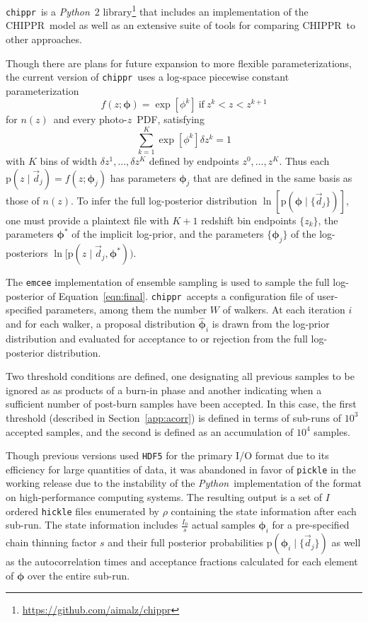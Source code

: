\documentclass[iop]{emulateapj}
\newcommand{\todo}[3]{{\color{#2}\emph{#1}: #3}}
\newcommand{\aim}[1]{\todo{AIM}{red}{#1}}
\newcommand{\Sect}[1]{Section~\ref{#1}}
\newcommand{\Eq}[1]{Equation~\ref{#1}}
\newcommand{\project}[1]{\textsc{#1}}
\newcommand{\Chippr}{\project{CHIPPR}}%
\newcommand{\repo}[1]{\texttt{#1}}
\newcommand{\chippr}{\repo{chippr}}
\newcommand{\emcee}{\repo{emcee}}
\newcommand{\python}{\textit{Python}}%
\newcommand{\data}{\ensuremath{\vec{d}}}%
\newcommand{\pr}[1]{\ensuremath{\mathrm{p}(#1)}}%
\newcommand{\gvn}{\mid}%
\newcommand{\pz}{photo-$z$}
\newcommand{\pzpdf}{\pz\ PDF}%
\newcommand{\nz}{$n(z)$}
\newcommand{\bvec}[1]{\ensuremath{\boldsymbol{#1}}}%
\newcommand{\ndphi}{\bvec{\phi}}
\begin{document}
\chippr\ is a \python\ 2 library\footnote{\url{https://github.com/aimalz/chippr}} that includes an implementation of the \Chippr\ model as well as an extensive suite of tools for comparing \Chippr\ to other approaches.

Though there are plans for future expansion to more flexible parameterizations, the current version of \chippr\ uses a log-space piecewise constant parameterization
\begin{equation}
\label{eqn:logstepfunc}
f(z; \ndphi) = \exp[\phi^{k}]\ \mathrm{if}\ z^{k} < z < z^{k+1}
\end{equation}
for \nz\ and every \pzpdf, satisfying
\begin{equation}
\label{eqn:logstepfuncnorm}
\sum_{k=1}^{K} \exp[\phi^{k}] \delta z^{k} = 1
\end{equation}
with $K$ bins of width $\delta z^{1}, \dots, \delta z^{K}$ defined by endpoints $z^{0}, \dots, z^{K}$.
Thus each $\pr{z \gvn \data_{j}} = f(z; \ndphi_{j})$ has parameters $\ndphi_{j}$ that are defined in the same basis as those of \nz.
To infer the full log-posterior distribution $\ln[\pr{\ndphi \gvn \{\data_{j}\}}]$, one must provide a plaintext file with $K+1$ redshift bin endpoints $\{z_{k}\}$, the parameters $\ndphi^{*}$ of the implicit log-prior, and the parameters $\{\ndphi_{j}\}$ of the log-posteriors $\ln[\pr{z \gvn \data_{j}, \ndphi^{*})}$.

The \emcee \citep{foreman-mackey_emcee_2013} implementation of ensemble sampling is used to sample the full log-posterior of \Eq{eqn:final}. 
\chippr\ accepts a configuration file of user-specified parameters, among them the number $W$ of walkers.
At each iteration $i$ and for each walker, a proposal distribution $\hat{\ndphi}_{i}$ is drawn from the log-prior distribution and evaluated for acceptance to or rejection from the full log-posterior distribution.

Two threshold conditions are defined, one designating all previous samples to be ignored as as products of a burn-in phase and another indicating when a sufficient number of post-burn samples have been accepted.  
In this case, the first threshold (described in \Sect{app:acorr}) is defined in terms of sub-runs of $10^{3}$ accepted samples, and the second is defined as an accumulation of $10^{4}$ samples.

Though previous versions used \texttt{HDF5} for the primary I/O format due to its efficiency for large quantities of data, it was abandoned in favor of \texttt{pickle} in the working release due to the instability of the \python\ implementation of the format on high-performance computing systems.  
The resulting output is a set of $I$ ordered \texttt{hickle} files enumerated by $\rho$ containing the state information after each sub-run.  
The state information includes $\frac{I_{0}}{s}$ actual samples $\ndphi_{i}$ for a pre-specified chain thinning factor $s$ and their full posterior probabilities $\pr{\ndphi_{i} \gvn \{\data_{j}\}}$ as well as the autocorrelation times and acceptance fractions calculated for each element of $\ndphi$ over the entire sub-run.  
\end{document}
